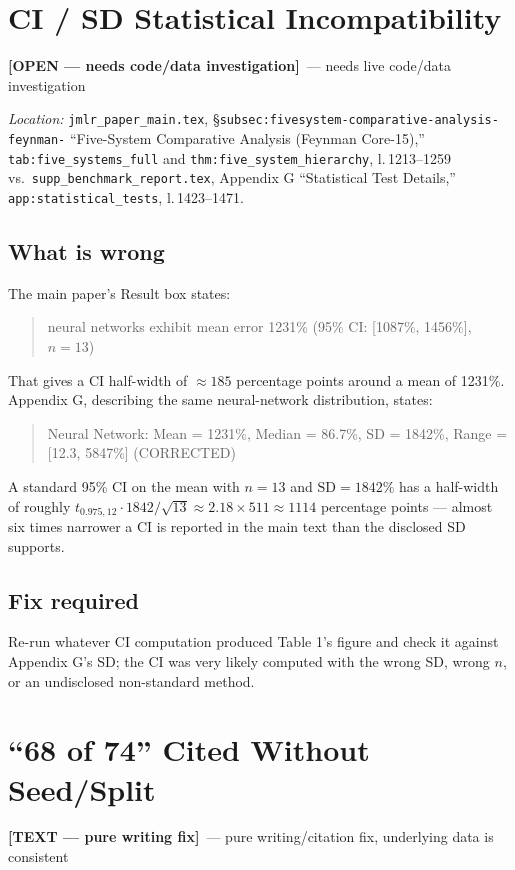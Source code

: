 \documentclass[11pt]{article}
\newcommand{\open}{\textcolor{red!60!black}{\textbf{[OPEN --- needs code/data investigation]}}}
\newcommand{\textfix}{\textcolor{green!40!black}{\textbf{[TEXT --- pure writing fix]}}}
\newcommand{\loc}[1]{\textit{Location:} #1\par}
\newenvironment{evidence}
  {\begin{quote}\small\ttfamily}
  {\end{quote}}
\begin{document}
\section{CI / SD Statistical Incompatibility}
\label{issue:4}
\open\ --- needs live code/data investigation

\loc{\texttt{jmlr\_paper\_main.tex}, \S\texttt{subsec:fivesystem-comparative-analysis-feynman-}
``Five-System Comparative Analysis (Feynman Core-15),'' \texttt{tab:five\_systems\_full}
and \texttt{thm:five\_system\_hierarchy}, l.\,1213--1259 vs.\
\texttt{supp\_benchmark\_report.tex}, Appendix G ``Statistical Test
Details,'' \texttt{app:statistical\_tests}, l.\,1423--1471.}

\subsection*{What is wrong}
The main paper's Result box states:
\begin{evidence}
neural networks exhibit mean error 1231\% (95\% CI: [1087\%, 1456\%], $n=13$)
\end{evidence}
That gives a CI half-width of $\approx 185$ percentage points around a mean
of 1231\%. Appendix G, describing the same neural-network distribution,
states:
\begin{evidence}
Neural Network: Mean = 1231\%, Median = 86.7\%, SD = 1842\%,
Range = [12.3, 5847\%] (CORRECTED)
\end{evidence}
A standard 95\% CI on the mean with $n=13$ and $\mathrm{SD}=1842\%$ has a
half-width of roughly $t_{0.975,12}\cdot 1842/\sqrt{13} \approx 2.18 \times
511 \approx 1114$ percentage points --- almost six times narrower a CI is
reported in the main text than the disclosed SD supports.

\subsection*{Fix required}
Re-run whatever CI computation produced Table 1's figure and check it
against Appendix G's SD; the CI was very likely computed with the wrong SD,
wrong $n$, or an undisclosed non-standard method.

\section{``68 of 74'' Cited Without Seed/Split}
\label{issue:5}
\textfix\ --- pure writing/citation fix, underlying data is consistent
\end{document}
